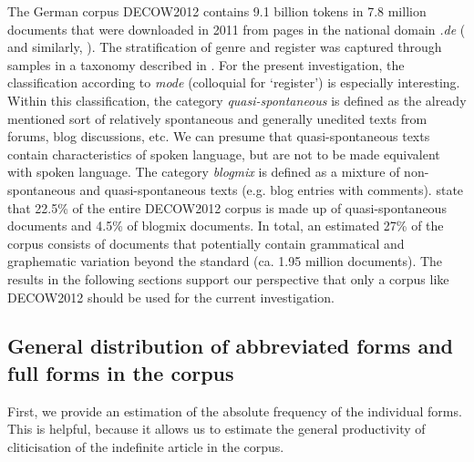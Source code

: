 The German corpus DECOW2012 contains 9.1 billion tokens in 7.8 million documents that were downloaded in 2011 from pages in the national domain \textit{.de} (\citealt{SchaeferBildhauer2012} and similarly, \citealt{BaroniEa2009}).
The stratification of genre and register was captured through samples in a taxonomy described in \citet{Scharoff2006}.
For the present investigation, the classification according to \textit{mode} (colloquial for `register') is especially interesting.
Within this classification, the category \textit{quasi-spontaneous} is defined as the already mentioned sort of relatively spontaneous and generally unedited texts from forums, blog discussions, etc.
We can presume that quasi-spontaneous texts contain characteristics of spoken language, but are not to be made equivalent with spoken language.
The category \textit{blogmix} is defined as a mixture of non-spontaneous and quasi-spontaneous texts (e.g. blog entries with comments).
\citet[492]{SchaeferBildhauer2012} state that 22.5\% of the entire DECOW2012 corpus is made up of quasi-spontaneous documents and 4.5\% of blogmix documents.
In total, an estimated 27\% of the corpus consists of documents that potentially contain grammatical and graphematic variation beyond the standard (ca. 1.95 million documents).
The results in the following sections support our perspective that only a corpus like DECOW2012 should be used for the current investigation.

\subsection[General distribution of abbreviated forms and full forms]{General distribution of abbreviated forms and full forms in the corpus}
\label{subsec:22distribInCorpus}

First, we provide an estimation of the absolute frequency of the individual forms.
This is helpful, because it allows us to estimate the general productivity of cliticisation of the indefinite article in the corpus.

